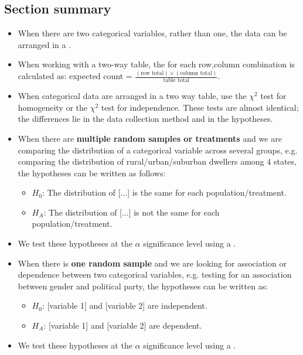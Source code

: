 \subsection*{Section summary}
\begin{itemize}

\item When there are two categorical variables, rather than one, the data can be arranged in a .

\item When working with a two-way table, the  for each row,column combination is calculated as: expected count = $\frac{(\text{row total})\times (\text{column total})}{\text{table total}}$.  

\item When categorical data are arranged in a two way table, use the $\chi^2$ test for homogeneity or the $\chi^2$ test for independence.  These tests are almost identical;  the differences lie in the data collection method and in the hypotheses.

\item When there are \textbf{multiple random samples or treatments} and we are comparing the distribution of a categorical variable across several groups, e.g. comparing the distribution of rural/urban/suburban dwellers among 4 states, the hypotheses can be written as follows:  
 \begin{itemize}
\item[] $H_0$:  The distribution of [...] is the same for each population/treatment.  
\item[] $H_A$:  The distribution of [...] is not the same for each population/treatment.
\end{itemize}
\item[] We test these hypotheses at the $\alpha$ significance level using a .

\item When there is \textbf{one random sample} and we are looking for association or dependence between two categorical variables, e.g. testing for an association between gender and political party, the hypotheses can be written as:
\begin{itemize}
\item[] $H_0$:  [variable 1] and [variable 2] are independent.   
\item[]  $H_A$:  [variable 1] and [variable 2] are dependent.
\end{itemize}
\item[] We test these hypotheses at the $\alpha$ significance level using a .


\end{itemize}
